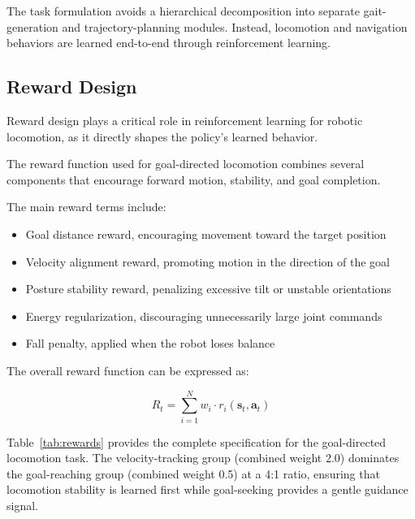 \documentclass[pdflatex,sn-mathphys-num]{sn-jnl}%
\theoremstyle{thmstyleone}%
\theoremstyle{thmstyletwo}%
\theoremstyle{thmstylethree}%
\begin{document}
The task formulation avoids a hierarchical decomposition into separate gait-generation and trajectory-planning modules. Instead, locomotion and navigation behaviors are learned end-to-end through reinforcement learning.

\subsection{Reward Design}
Reward design plays a critical role in reinforcement learning for robotic locomotion, as it directly shapes the policy's learned behavior.

The reward function used for goal-directed locomotion combines several components that encourage forward motion, stability, and goal completion.

The main reward terms include:
\begin{itemize}
    \item Goal distance reward, encouraging movement toward the target position
    \item Velocity alignment reward, promoting motion in the direction of the goal
    \item Posture stability reward, penalizing excessive tilt or unstable orientations
    \item Energy regularization, discouraging unnecessarily large joint commands
    \item Fall penalty, applied when the robot loses balance
\end{itemize}   

The overall reward function can be expressed as:

\begin{equation}
R_t = \sum_{i=1}^{N} w_i \cdot r_i(\mathbf{s}_t, \mathbf{a}_t)
\label{eq:reward}
\end{equation}

Table~\ref{tab:rewards} provides the complete specification for the goal-directed
locomotion task.
The velocity-tracking group (combined weight 2.0) dominates the goal-reaching group
(combined weight 0.5) at a 4:1 ratio, ensuring that locomotion stability is learned
first while goal-seeking provides a gentle guidance signal.
\end{document}

